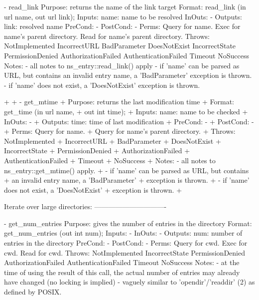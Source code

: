 \begin{myspec}
 
    - read_link 
      Purpose:  returns the name of the link target
      Format:   read_link          (in  url       name,
                                    out url       link);
      Inputs:   name:               name to be resolved
      InOuts:   -
      Outputs:  link:               resolved name
      PreCond:  -
      PostCond: -
      Perms:    Query for name.
                Exec  for name's parent directory.
                Read  for name's parent directory.
      Throws:   NotImplemented
                IncorrectURL
                BadParameter
                DoesNotExist
                IncorrectState
                PermissionDenied
                AuthorizationFailed
                AuthenticationFailed
                Timeout
                NoSuccess
      Notes:    - all notes to ns_entry::read_link() apply
                - if 'name' can be parsed as URL, but contains 
                  an invalid entry name, a 'BadParameter'
                  exception is thrown.
                - if 'name' does not exist, a 'DoesNotExist'
                  exception is thrown.
 
+
+   - get_mtime
+     Purpose:  returns the last modification time
+     Format:   get_time           (in  url       name,
+                                   out int time);
+     Inputs:   name:               name to be checked
+     InOuts:   -
+     Outputs:  time:               time of last modification
+     PreCond:  -
+     PostCond: -
+     Perms:    Query for name.
+               Query for name's parent directory.
+     Throws:   NotImplemented
+               IncorrectURL
+               BadParameter
+               DoesNotExist
+               IncorrectState
+               PermissionDenied
+               AuthorizationFailed
+               AuthenticationFailed
+               Timeout
+               NoSuccess
+     Notes:    - all notes to ns_entry::get_mtime() apply.
+               - if 'name' can be parsed as URL, but contains 
+                 an invalid entry name, a 'BadParameter'
+                 exception is thrown.
+               - if 'name' does not exist, a 'DoesNotExist'
+                 exception is thrown.
+
 
 
    Iterate over large directories:
    -------------------------------
 
    - get_num_entries
      Purpose:  gives the number of entries in the directory
      Format:   get_num_entries    (out int   num);
      Inputs:   -
      InOuts:   -
      Outputs:  num:                number of entries in the
                                    directory
      PreCond:  -
      PostCond: -
      Perms:    Query for cwd.
                Exec  for cwd.
                Read  for cwd.
      Throws:   NotImplemented
                IncorrectState
                PermissionDenied
                AuthorizationFailed
                AuthenticationFailed
                Timeout
                NoSuccess
      Notes:    - at the time of using the result of this call,
                  the actual number of entries may already have
                  changed (no locking is implied)
                - vaguely similar to 'opendir'/'readdir' (2) as
                  defined by POSIX.
 

\end{myspec}
